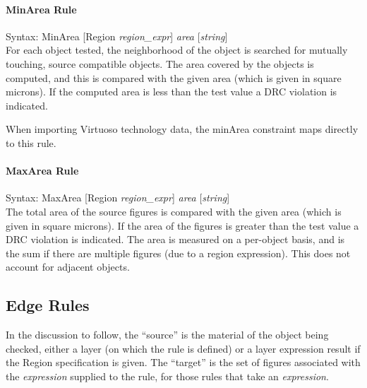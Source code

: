 \paragraph{{\et MinArea} Rule}

\begin{description}
\item{Syntax: {\vt MinArea} [{\vt Region} {\it region\_expr\/}] {\it area}
 [{\it string\/}]}\\

For each object tested, the neighborhood of the object is searched for
mutually touching, source compatible objects.  The area covered by the
objects is computed, and this is compared with the given area (which
is given in square microns).  If the computed area is less than the
test value a DRC violation is indicated. 

When importing Virtuoso technology data, the {\vt minArea}
constraint maps directly to this rule.
\end{description}

\paragraph{{\et MaxArea} Rule}

\begin{description}
\item{Syntax: {\vt MaxArea} [{\vt Region} {\it region\_expr\/}] {\it area}
 [{\it string\/}]}\\

The total area of the source figures is compared with the given area
(which is given in square microns).  If the area of the figures is
greater than the test value a DRC violation is indicated.  The area is
measured on a per-object basis, and is the sum if there are multiple
figures (due to a region expression).  This does not account for
adjacent objects.
\end{description}

\subsection{Edge Rules}

In the discussion to follow, the ``source'' is the material of the
object being checked, either a layer (on which the rule is defined) or
a layer expression result if the {\vt Region} specification is given. 
The ``target'' is the set of figures associated with the {\it
expression} supplied to the rule, for those rules that take an {\it
expression}.

